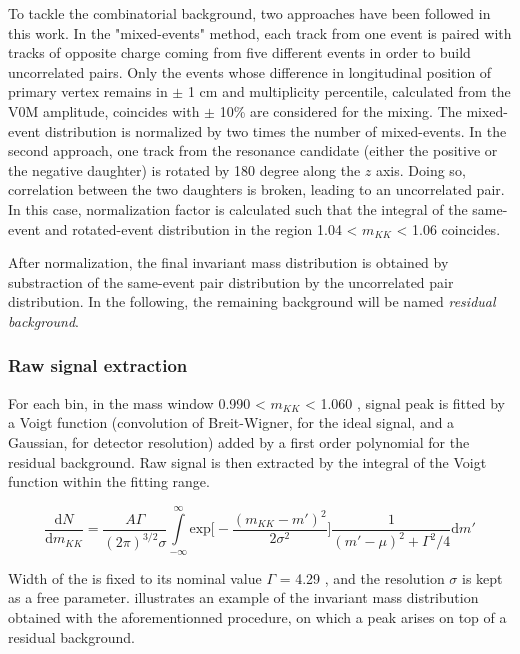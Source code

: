 To tackle the combinatorial background, two approaches have been followed in this work. In the "mixed-events" method, each track from one event is paired with tracks of opposite charge coming from five different events in order to build uncorrelated pairs. Only the events whose difference in longitudinal position of primary vertex remains in $\pm$ 1 cm and multiplicity percentile, calculated from the V0M amplitude, coincides with $\pm$ 10\% are considered for the mixing. The mixed-event distribution is normalized by two times the number of mixed-events. In the second approach, one track from the resonance candidate (either the positive or the negative daughter) is rotated by 180 degree along the $z$ axis. Doing so, correlation between the two daughters is broken, leading to an uncorrelated pair. In this case, normalization factor is calculated such that the integral of the same-event and rotated-event distribution in the region 1.04 < $m_{KK}$ < 1.06 \gmass coincides. 

After normalization, the final invariant mass distribution is obtained by substraction of the same-event pair distribution by the uncorrelated pair distribution. In the following, the remaining background will be named \textit{residual background}.

\subsubsection{Raw signal extraction}

For each \pT bin, in the mass window 0.990 < $m_{KK}$ < 1.060 \gmass, signal peak is fitted by a Voigt function (convolution of Breit-Wigner, for the ideal signal, and a Gaussian, for detector resolution) added by a first order polynomial for the residual background. Raw signal is then extracted by the integral of the Voigt function within the fitting range.

\begin{equation}
\frac{\text{d}N}{\text{d}m_{KK}} = \frac{A \Gamma}{(2\pi)^{3/2} \sigma} \int\limits_{-\infty}^{\infty} \text{exp} \big [ -\frac{(m_{KK} - m')^2}{2\sigma^2} \big ] \frac{1}{(m' - \mu)^2 + \Gamma^2/4} \text{d} m'
\end{equation}\label{eq:PhiSignal}

Width of the \rmPhiMes is fixed to its nominal value $\Gamma$ = 4.29 \mev , and the resolution $\sigma$ is kept as a free parameter. \fig illustrates an example of the invariant mass distribution obtained with the aforementionned procedure, on which a \rmPhiMes peak arises on top of a residual background. 

